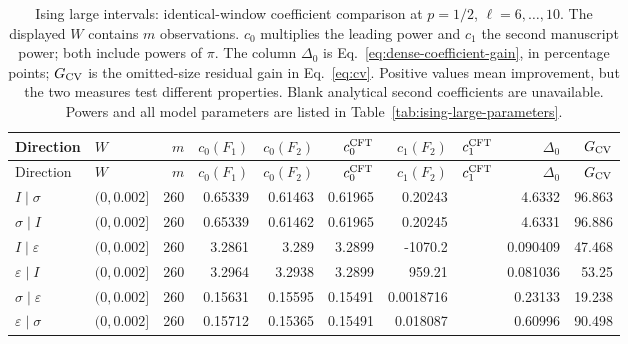 \begingroup\setlength{\tabcolsep}{2pt}
\begin{longtable}{llrrrrrrrr}
\caption{Ising large intervals: identical-window coefficient comparison at $p=1/2$, $\ell=6,\ldots,10$. The displayed $W$ contains $m$ observations. $c_0$ multiplies the leading power and $c_1$ the second manuscript power; both include powers of $\pi$. The column $\Delta_0$ is Eq.~\eqref{eq:dense-coefficient-gain}, in percentage points; $G_{\rm CV}$ is the omitted-size residual gain in Eq.~\eqref{eq:cv}. Positive values mean improvement, but the two measures test different properties. Blank analytical second coefficients are unavailable. Powers and all model parameters are listed in Table~\ref{tab:ising-large-parameters}.}
\label{tab:dense-large-ising}\\\toprule
Direction & $W$ & $m$ & $c_0(F_1)$ & $c_0(F_2)$ & $c_0^{\rm CFT}$ & $c_1(F_2)$ & $c_1^{\rm CFT}$ & $\Delta_0$ & $G_{\rm CV}$\\\midrule
\endfirsthead
\toprule
Direction & $W$ & $m$ & $c_0(F_1)$ & $c_0(F_2)$ & $c_0^{\rm CFT}$ & $c_1(F_2)$ & $c_1^{\rm CFT}$ & $\Delta_0$ & $G_{\rm CV}$\\\midrule
\endhead
\bottomrule\endfoot
$I\mid \sigma$ & $(0,0.002]$ & 260 & 0.65339 & 0.61463 & 0.61965 & 0.20243 &  & 4.6332 & 96.863\\
$\sigma\mid I$ & $(0,0.002]$ & 260 & 0.65339 & 0.61462 & 0.61965 & 0.20245 &  & 4.6331 & 96.886\\
$I\mid \varepsilon$ & $(0,0.002]$ & 260 & 3.2861 & 3.289 & 3.2899 & -1070.2 &  & 0.090409 & 47.468\\
$\varepsilon\mid I$ & $(0,0.002]$ & 260 & 3.2964 & 3.2938 & 3.2899 & 959.21 &  & 0.081036 & 53.25\\
$\sigma\mid \varepsilon$ & $(0,0.002]$ & 260 & 0.15631 & 0.15595 & 0.15491 & 0.0018716 &  & 0.23133 & 19.238\\
$\varepsilon\mid \sigma$ & $(0,0.002]$ & 260 & 0.15712 & 0.15365 & 0.15491 & 0.018087 &  & 0.60996 & 90.498\\
\end{longtable}
\endgroup
